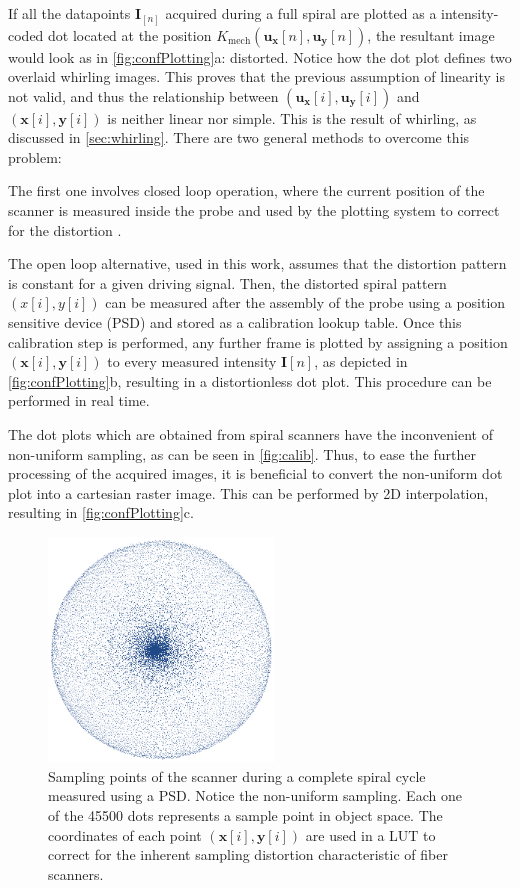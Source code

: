 If all the datapoints $\mathbf{I}_{[n]}$ acquired during a full spiral are plotted as a intensity-coded dot located at the position $K_\mathrm{mech}(\mathbf{u_x}[n], \mathbf{u_y}[n])$, the resultant image would look as in \autoref{fig:confPlotting}a: distorted. Notice how the dot plot defines two overlaid whirling images. This proves that the previous assumption of linearity is not valid, and thus the relationship between $(\mathbf{u_x}[i], \mathbf{u_y}[i])$ and $(\mathbf{x}[i], \mathbf{y}[i])$ is neither linear nor simple. This is the result of whirling, as discussed in \autoref{sec:whirling}. There are two general methods to overcome this problem:

The first one involves closed loop operation, where the current position of the scanner is measured inside the probe and used by the plotting system to correct for the distortion \cite{Yeoh2014}. 

The open loop alternative, used in this work, assumes that the distortion pattern is constant for a given driving signal. Then, the distorted spiral pattern $(x[i], y[i])$ can be measured after the assembly of the probe using a position sensitive device (PSD) and stored as a calibration lookup table.
Once this calibration step is performed, any further frame is plotted by assigning a position $(\mathbf{x}[i], \mathbf{y}[i])$ to every measured intensity $\mathbf{I}[n]$, as depicted in \autoref{fig:confPlotting}b, resulting in a distortionless dot plot. This procedure can be performed in real time.

The dot plots which are obtained from spiral scanners have the inconvenient of non-uniform sampling, as can be seen in \autoref{fig:calib}. Thus, to ease the further processing of the acquired images, it is beneficial to convert the non-uniform dot plot into a cartesian raster image. This can be performed by 2D interpolation, resulting in \autoref{fig:confPlotting}c.


\begin{figure}[h!]\centering \includegraphics[width=6cm]{figures/50_Measurements/conf/proc/samplingDensity.png}
      \caption{Sampling points of the scanner during a complete spiral cycle measured using a PSD. Notice the non-uniform sampling. Each one of the 45500 dots represents a sample point in object space. The coordinates of each point $(\mathbf{x}[i], \mathbf{y}[i])$ are used in a LUT to correct for the inherent sampling distortion characteristic of fiber scanners.}
      \label{fig:calib}
\end{figure}


